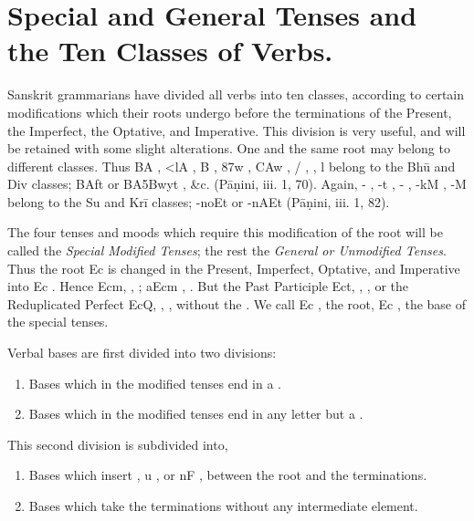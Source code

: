 \def\DevnagVersion{2.17}%
\chapter{Special and General Tenses and the Ten Classes of Verbs.}

\s Sanskrit grammarians have divided all verbs into ten classes,
according to certain modifications which their roots undergo before the
terminations of the Present, the Imperfect, the Optative, and
Imperative. This division is very useful, and will be retained with some
slight alterations. One and the same root may belong to different
classes. Thus {\dn B\5A} , {\dn <lA} , {\dn B\5}
, {\dn \387w} , {\dn \3CAw} , {\dn /} ,
{\dn \7{/}} , {\dn l}  belong to the Bhū and Div classes;
{\dn B\5Aft\?}  or {\dn B\5A\35Bwyt\?} , \&c.
(Pāṇini, iii. 1, 70). Again, {\dn -} , {\dn -t\2} ,
{\dn -\2} , {\dn -kM} , {\dn -M} 
belong to the Su and Krī classes; {\dn -noEt}  or {\dn -nAEt}
 (Pāṇini, iii. 1, 82).

\s The four tenses and moods which require this modification of the root
will be called the \emph{Special Modified Tenses}; the rest the
\emph{General or Unmodified Tenses}. Thus the root {\dn Ec}  is
changed in the Present, Imperfect, Optative, and Imperative into {\dn Ec}
. Hence {\dn Ecm,} , ; {\dn aEcm}
, . But the Past Participle {\dn Ect,}
, , or the Reduplicated Perfect {\dn EcQ,}
, , without the {\dn {}} . We call
{\dn Ec} , the root, {\dn Ec} , the base of the special
tenses.

\s Verbal bases are first divided into two divisions:

\begin{enumerate}
\item Bases which in the modified tenses end in {\dn a} .
\item Bases which in the modified tenses end in any letter but {\dn a} .
\end{enumerate}

This second division is subdivided into,

\begin{enumerate}
\item Bases which insert {\dn {}} , {\dn u} , or {\dn nF} ,
  between the root and the terminations.
\item Bases which take the terminations without any intermediate
  element.
\end{enumerate}

